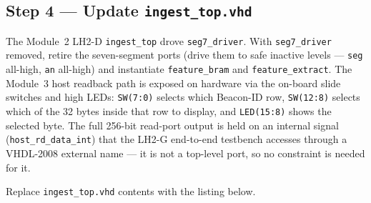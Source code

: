 \documentclass[11pt,letterpaper]{article}
\begin{document}
\subsection{Step 4 --- Update \texttt{ingest\_top.vhd}}

The Module~2 LH2-D \texttt{ingest\_top} drove \texttt{seg7\_driver}. With \texttt{seg7\_driver} removed, retire the seven-segment ports (drive them to safe inactive levels --- \texttt{seg} all-high, \texttt{an} all-high) and instantiate \texttt{feature\_bram} and \texttt{feature\_extract}. The Module~3 host readback path is exposed on hardware via the on-board slide switches and high LEDs: \texttt{SW(7:0)} selects which Beacon-ID row, \texttt{SW(12:8)} selects which of the 32 bytes inside that row to display, and \texttt{LED(15:8)} shows the selected byte. The full 256-bit \BRAM{} read-port output is held on an internal signal (\texttt{host\_rd\_data\_int}) that the LH2-G end-to-end testbench accesses through a VHDL-2008 external name --- it is not a top-level port, so no constraint is needed for it.

Replace \texttt{ingest\_top.vhd} contents with the listing below.
\end{document}
